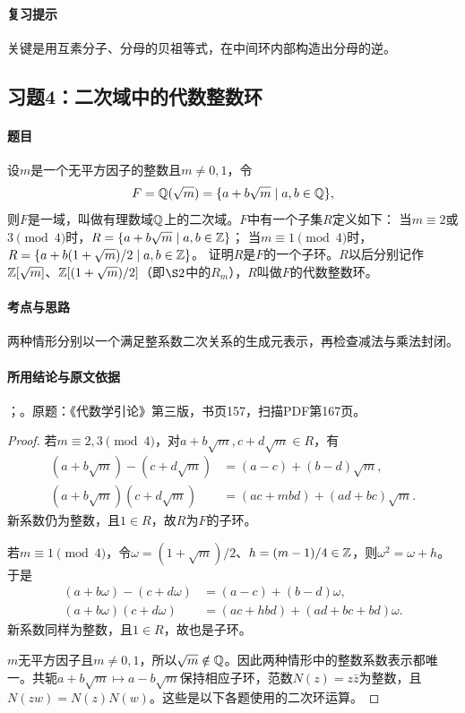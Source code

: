 \paragraph{复习提示}

关键是用互素分子、分母的贝祖等式，在中间环内部构造出分母的逆。

\subsection{习题4：二次域中的代数整数环}

\label{ex:4:4}

\paragraph{题目}

设$m$是一个无平方因子的整数且$m\ne0,1$，令
\[
F=\mathbb Q(\sqrt m)=\{a+b\sqrt m\mid a,b\in\mathbb Q\},
\]
则$F$是一域，叫做有理数域$\mathbb Q$上的二次域。$F$中有一个子集$R$定义如下：
当$m\equiv2$或$3\pmod4$时，$R=\{a+b\sqrt m\mid a,b\in\mathbb Z\}$；
当$m\equiv1\pmod4$时，$R=\{a+b(1+\sqrt m)/2\mid a,b\in\mathbb Z\}$。
证明$R$是$F$的一个子环。$R$以后分别记作$\mathbb Z[\sqrt m]$、$\mathbb Z[(1+\sqrt m)/2]$（即$\S2$中的$R_m$），$R$叫做$F$的代数整数环。

\paragraph{考点与思路}

两种情形分别以一个满足整系数二次关系的生成元表示，再检查减法与乘法封闭。

\paragraph{所用结论与原文依据}

；。原题：《代数学引论》第三版，书页157，扫描PDF第167页。


\begin{proof}

若$m\equiv2,3\pmod4$，对$a+b\sqrt m,c+d\sqrt m\in R$，有
\begin{align*}
(a+b\sqrt m)-(c+d\sqrt m)&=(a-c)+(b-d)\sqrt m,\\
(a+b\sqrt m)(c+d\sqrt m)&=(ac+mbd)+(ad+bc)\sqrt m.
\end{align*}
新系数仍为整数，且$1\in R$，故$R$为$F$的子环。

若$m\equiv1\pmod4$，令$\omega=(1+\sqrt m)/2$、$h=(m-1)/4\in\mathbb Z$，则$\omega^2=\omega+h$。于是
\begin{align*}
(a+b\omega)-(c+d\omega)&=(a-c)+(b-d)\omega,\\
(a+b\omega)(c+d\omega)&=(ac+hbd)+(ad+bc+bd)\omega.
\end{align*}
新系数同样为整数，且$1\in R$，故也是子环。

$m$无平方因子且$m\ne0,1$，所以$\sqrt m\notin\mathbb Q$。因此两种情形中的整数系数表示都唯一。共轭$a+b\sqrt m\mapsto a-b\sqrt m$保持相应子环，范数$N(z)=z\bar z$为整数，且$N(zw)=N(z)N(w)$。这些是以下各题使用的二次环运算。

\end{proof}

